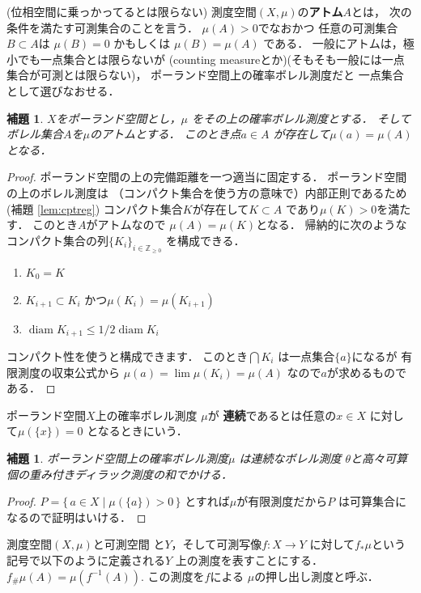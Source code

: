 \documentclass[leqno, 12pt]{jsarticle}
\newtheorem{lem}[thm]{補題}
\newcommand{\zz}{\mathbb{Z}}
\DeclareMathOperator{\di}{diam}
\newcommand{\myppp}[2]{#1_{\#}#2}
\begin{document}
(位相空間に乗っかってるとは限らない)
測度空間$(X, \mu)$の\textbf{アトム}$A$とは，
次の条件を満たす可測集合のことを言う．
$\mu(A)>0$でなおかつ
任意の可測集合
$B\subset A$は
$\mu(B)=0$
かもしくは
$\mu(B)=\mu(A)$
である．
一般にアトムは，極小でも一点集合とは限らないが
(counting measureとか)(そもそも一般には一点集合が可測とは限らない)，
ポーランド空間上の確率ボレル測度だと
一点集合として選びなおせる．


\begin{lem}\label{lem:atom}
$X$をポーランド空間とし，$\mu$
をその上の確率ボレル測度とする．
そしてボレル集合$A$を$\mu$のアトムとする．
このとき点$a\in A$
が存在して$\mu(a)=\mu(A)$
となる．
\end{lem}
\begin{proof}
ポーランド空間の上の完備距離を一つ適当に固定する．
ポーランド空間の上のボレル測度は
（コンパクト集合を使う方の意味で）内部正則であるため
(補題 \ref{lem:cptreg})
コンパクト集合$K$が存在して$K\subset A$
であり$\mu(K)>0$を満たす．
このとき$A$がアトムなので
$\mu(A)=\mu(K)$となる．
帰納的に次のようなコンパクト集合の列$\{K_{i}\}_{i\in \zz_{\ge 0}}$
を構成できる．
\begin{enumerate}
\item 
$K_{0}=K$
\item 
$K_{i+1}\subset K_{i}$
かつ$\mu(K_{i})=\mu(K_{i+1})$
\item 
$\di K_{i+1}\le 1/2\di K_{i}$
\end{enumerate}
コンパクト性を使うと構成できます．
このとき$\bigcap K_{i}$
は一点集合$\{a\}$になるが
有限測度の収束公式から
$\mu(a)=\lim\mu(K_{i})=\mu(A)$
なので$a$が求めるものである．
\end{proof}


ポーランド空間$X$上の確率ボレル測度
$\mu$が
\textbf{連続}であるとは任意の$x\in X$
に対して$\mu(\{x\})=0$
となるときにいう．

\begin{lem}\label{lem:dirac}
ポーランド空間上の確率ボレル測度$\mu$
は連続なボレル測度
$\theta$と高々可算個の重み付きディラック測度の和でかける．
\end{lem}
\begin{proof}
$P=\{\,a\in X\mid \mu(\{a\})>0 \, \}$
とすれば$\mu$が有限測度だから$P$
は可算集合になるので証明はいける．
\end{proof}

測度空間$(X, \mu)$と可測空間
と$Y$，そして可測写像$f\colon X\to Y$
に対して$f_{*}\mu$という記号で以下のように定義される$Y$
上の測度を表すことにする．
$\myppp{f}{\mu}(A)=\mu(f^{-1}(A))$. 
この測度を$f$による
$\mu$の押し出し測度と呼ぶ．
\end{document}
